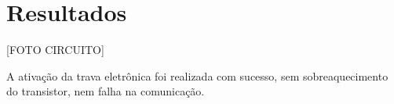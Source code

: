 \section{Resultados}

[FOTO CIRCUITO]


A ativação da trava eletrônica foi realizada com sucesso, sem sobreaquecimento do transistor, nem falha na comunicação.
